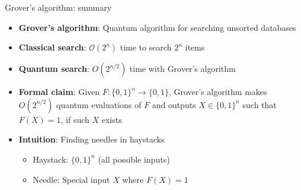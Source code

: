 \documentclass[aspectratio=169, lualatex]{beamer} %
\begin{document}
\begin{frame}{Grover's algorithm: summary}
	\begin{itemize}
		\item \textbf{Grover's algorithm}: Quantum algorithm for searching unsorted databases
		\item \textbf{Classical search}: $\mathcal{O}(2^n)$ time to search $2^n$ items \pause
		\item \textbf{Quantum search}: $O(2^{n/2})$ time with Grover's algorithm \pause
		\item \textbf{Formal claim}: Given $F: \{0,1\}^n \rightarrow \{0,1\}$, Grover's algorithm makes $O(2^{n/2})$ quantum evaluations of $F$ and outputs $X \in \{0,1\}^n$ such that $F(X) = 1$, if such $X$ exists \pause
		\item \textbf{Intuition}: Finding needles in haystacks
		      \begin{itemize}
			      \item Haystack: $\{0,1\}^n$ (all possible inputs)
			      \item Needle: Special input $X$ where $F(X) = 1$
		      \end{itemize}
	\end{itemize}
\end{frame}
\end{document}

